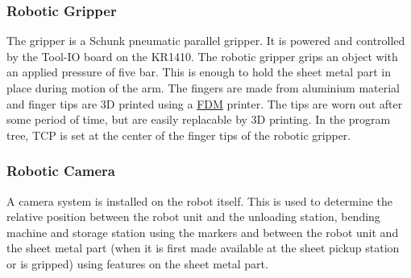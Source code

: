 \subsubsection{Robotic Gripper}
The gripper is a Schunk pneumatic parallel gripper. It is powered and controlled by the Tool-IO board on the KR1410.
The robotic gripper grips an object with an applied pressure of five bar. This is enough to hold the sheet metal part
in place during motion of the arm. 
The fingers are made from aluminium material and finger tips are 3D printed using a \hyperref[acro:FDM]{FDM} printer. The tips are worn out
after some period of time, but are easily replacable by 3D printing.
In the program tree, TCP is set at the center of the finger tips of the robotic gripper.


\subsubsection{Robotic Camera}
A camera system is installed on the robot itself. This is used to determine the relative
position between the robot unit and the unloading station, bending machine and storage station using the markers
and between the robot unit and the sheet metal part (when it is first made available at the
sheet pickup station or is gripped) using features on the sheet metal part.
